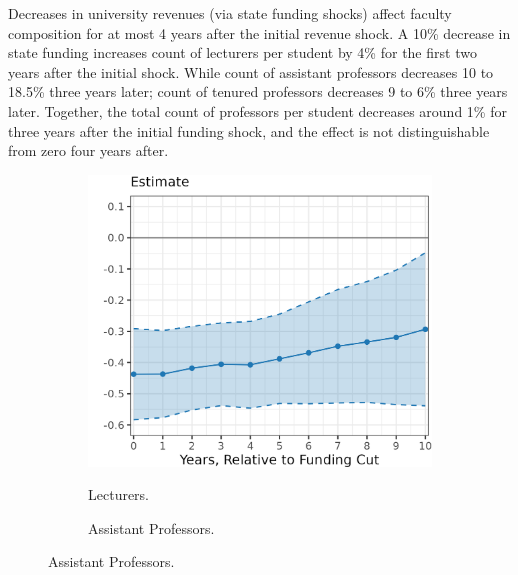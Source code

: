 Decreases in university revenues (via state funding shocks) affect faculty composition for at most 4 years after the initial revenue shock.
A 10\% decrease in state funding increases count of lecturers per student by 4\% for the first two years after the initial shock.
While count of assistant professors decreases 10 to 18.5\% three years later;
count of tenured professors decreases 9 to 6\% three years later.
Together, the total count of professors per student decreases around 1\% for three years after the initial funding shock, and the effect is not distinguishable from zero four years after.
\begin{figure}[h!]
    \centering
    \singlespacing
    \caption{Local Projection Estimates for Professor Count per Student, by Professor Group.}
    \begin{subfigure}[b]{0.495\textwidth}
        \centering
        \caption{Lecturers.}
        \includegraphics[width=\textwidth]{figures/lecturer-count-lp.png}
        \label{fig:lecturer-count-lp}
    \end{subfigure}
    \begin{subfigure}[b]{0.495\textwidth}
        \centering
        \caption{Assistant Professors.}

\end{subfigure}
\end{figure}
